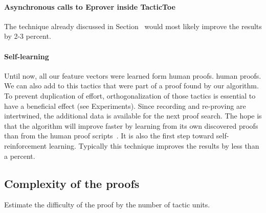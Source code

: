 \documentclass[runningheads,a4paper,draft]{svjour3}
\begin{document}
\paragraph{Asynchronous calls to Eprover inside TacticToe}
The technique already discussed in Section~ would most likely improve the 
results by 2-3 percent.

\paragraph{Self-learning}
Until now, all our feature vectors were learned form human proofs. 
human proofs. We can also add to this tactics that were part of a proof found 
by our algorithm. To prevent duplication of effort, orthogonalization of those 
tactics is essential to have a beneficial effect (see Experiments).
Since recording and re-proving are intertwined, the 
additional data is available for the next proof search.
The hope is that the algorithm will improve faster by learning from its own 
discovered proofs than from the human proof 
scripts~\cite{DBLP:conf/cade/Urban07}. It is also the first step toward 
self-reinforcement learning. Typically this technique improves the results by 
less than a percent.

\subsection{Complexity of the proofs}


Estimate the difficulty of the proof by the number of tactic units.
\end{document}
